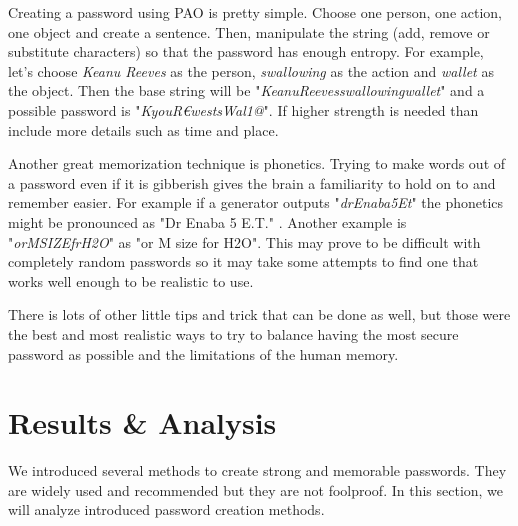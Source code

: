 \documentclass[acmsmall,nonacm]{acmart}
\begin{document}
Creating a password using PAO is pretty simple. Choose one person, one action, one object and create a sentence. Then, manipulate the string (add, remove or substitute characters) so that the password has enough entropy. For example, let's choose \emph{Keanu Reeves} as the person, \emph{swallowing} as the action and \emph{wallet} as the object. Then the base string will be "\emph{KeanuReevesswallowingwallet}" and a possible password is "\emph{KyouR€westsWal1@}". If higher strength is needed than include more details such as time and place. 

Another great memorization technique is phonetics. Trying to make words out of a password even if it is gibberish gives the brain a familiarity to hold on to and remember easier. For example if a generator outputs "\emph{drEnaba5Et}" the phonetics might be pronounced as "Dr Enaba 5 E.T." \cite{rubenking_2021}. Another example is "\emph{orMSIZEfrH2O}" as "or M size for H2O". This may prove to be difficult with completely random passwords so it may take some attempts to find one that works well enough to be realistic to use.

There is lots of other little tips and trick that can be done as well, but those were the best and most realistic ways to try to balance having the most secure password as possible and the limitations of the human memory.

\section{Results \& Analysis}

We introduced several methods to create strong and memorable passwords. They are widely used and recommended but they are not foolproof. In this section, we will analyze introduced password creation methods.
\end{document}
